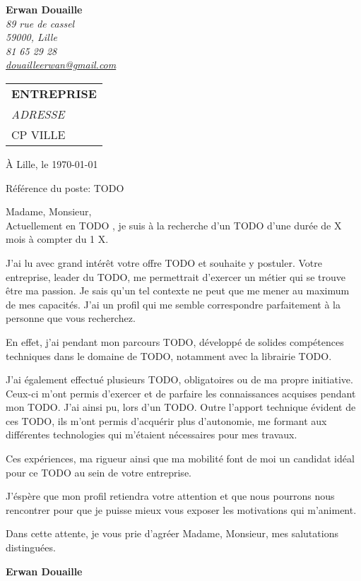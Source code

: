 \documentclass[11pt]{letter}
\begin{document}
\sffamily
\hfill

\vspace{-2.5cm}
\begin{flushleft}
{\bfseries Erwan Douaille}\\[.35ex]
\small\itshape
89 rue de cassel \\
59000, Lille\\[.35ex]
 81 65 29 28\\
\Letter 	\href{mailto:douailleerwan@gmail.com}{douailleerwan@gmail.com}
\end{flushleft}


\begin{flushright}
\begin{tabular}{l}
{\bfseries ENTREPRISE}\\[.35ex]
\small\itshape
ADRESSE \\
CP VILLE
\end{tabular}
\end{flushright}

\begin{flushright}
\`A Lille, le \today \\
\end{flushright}

\begin{flushleft}
Référence du poste: TODO
\end{flushleft}

Madame, Monsieur,\\

Actuellement en TODO , je suis à la recherche d'un TODO d'une durée de X mois à compter du 1 X.

J'ai lu avec grand intérêt votre offre TODO et souhaite y postuler. Votre entreprise, leader du TODO, me permettrait d'exercer un métier qui se trouve être ma passion. Je sais qu’un tel contexte ne peut que me mener au maximum de mes capacités. J’ai un profil qui me semble correspondre parfaitement à la personne que vous recherchez.

En effet, j'ai pendant mon parcours TODO, développé de solides compétences techniques dans le domaine de TODO, notamment avec la librairie TODO.

J'ai également effectué plusieurs TODO, obligatoires ou de ma propre initiative. Ceux-ci m'ont permis d'exercer et de parfaire les connaissances acquises pendant mon TODO. J'ai ainsi pu, lors d'un TODO. Outre l'apport technique évident de ces TODO, ils m'ont permis d'acquérir plus d'autonomie, me formant aux différentes technologies qui m’étaient nécessaires pour mes travaux. 

Ces expériences, ma rigueur ainsi que ma mobilité font de moi un candidat idéal pour ce TODO au sein de votre entreprise.

J’éspère que mon profil retiendra votre attention et que nous pourrons nous rencontrer pour que je puisse mieux vous exposer les motivations qui m’animent.

Dans cette attente, je vous prie d'agréer Madame, Monsieur, mes salutations distinguées.


\begin{flushright}
{\bfseries Erwan Douaille}\\
\end{flushright}

\vfill
\end{document}
